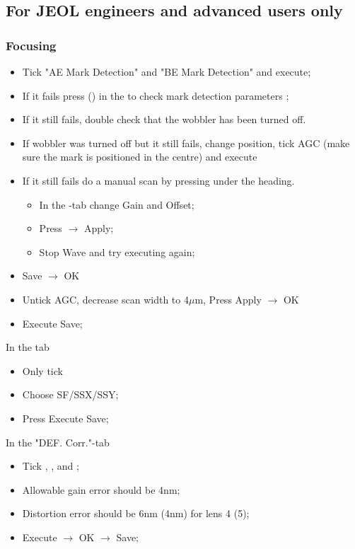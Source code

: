 \subsection{For JEOL engineers and advanced users only}

\subsubsection{Focusing}
\begin{itemize}
\item Tick  "AE Mark Detection" and  "BE Mark Detection"
  and execute;
\item  If it  fails  press  
  ()  in the  to check  mark
  detection parameters \ra {};
\item If it  still fails, double check  that the wobbler
  has been turned off.
\item  If wobbler  was turned  off but  it still  fails,
  change  position,  tick AGC  (make  sure  the mark  is
  positioned in the centre) and execute
\item If  it still  fails do a  manual scan  by pressing
   under the  heading.
  \begin{itemize}
  \item In the -tab change Gain and Offset;
  \item  Press   \ra {} $\rightarrow$ Apply;
  \item Stop Wave and try executing again;
  \end{itemize}
\item Save $\rightarrow$ OK
\item Untick AGC, decrease  scan width to 4$\mu$m, Press
  Apply $\rightarrow$ OK
\item Execute \ra Save;
\end{itemize}
In the  tab
\begin{itemize}
\item Only tick 
\item Choose SF/SSX/SSY;
\item Press Execute \ra Save;
\end{itemize}
In the "DEF. Corr."-tab
\begin{itemize}
\item   Tick   ,   ,   and
  ;
\item Allowable gain error should be 4nm;
\item Distortion  error should be  6nm (4nm) for  lens 4
  (5);
\item Execute $\rightarrow$ OK $\rightarrow$ Save;
\end{itemize}

